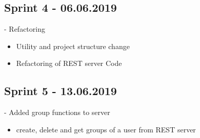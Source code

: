 \documentclass[12pt]{scrartcl}
\begin{document}
    \subsection{Sprint 4 - 06.06.2019}
    - Refactoring
    \begin{itemize}
        \item Utility and project structure change
        \item Refactoring of REST server Code
    \end{itemize}

    \subsection{Sprint 5 - 13.06.2019}
    - Added group functions to server
    \begin{itemize}
        \item create, delete and get groups of a user from REST server
    \end{itemize}

\end{document}
